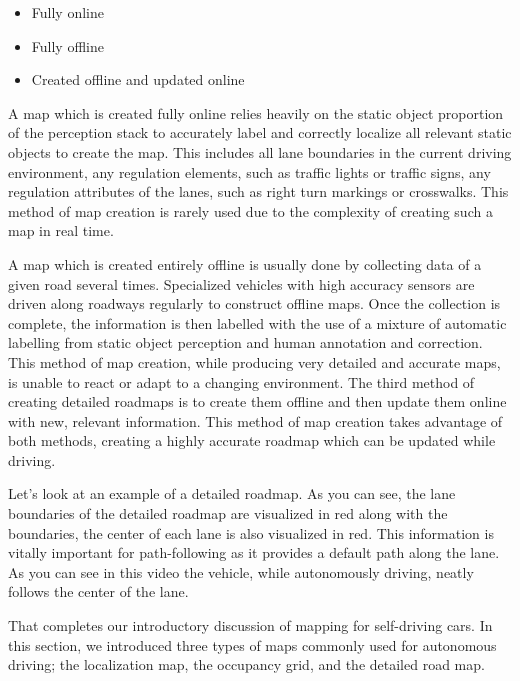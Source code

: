 \begin{itemize}
\item Fully online
\item Fully offline
\item Created offline and updated online
\end{itemize}

A map which is created fully online relies
heavily on the static object proportion of the perception stack
to accurately label and correctly localize all relevant
static objects to create the map. This includes all lane boundaries
in the current driving environment, any regulation elements,
such as traffic lights or traffic signs, any regulation attributes of the lanes,
such as right turn markings or crosswalks. This method of map creation is rarely used due to the complexity of
creating such a map in real time. 

A map which is created entirely offline
is usually done by collecting data of a given road several times. Specialized vehicles with high accuracy
sensors are driven along roadways regularly to construct offline maps. Once the collection is complete, the
information is then labelled with the use of a mixture of automatic labelling
from static object perception and human annotation and correction. This method of map creation,
while producing very detailed and accurate maps, is unable to react or
adapt to a changing environment. The third method of creating detailed
roadmaps is to create them offline and then update them online with new,
relevant information. This method of map creation
takes advantage of both methods, creating a highly accurate roadmap
which can be updated while driving. 

Let's look at an example of a detailed roadmap. As you can see, the lane boundaries of
the detailed roadmap are visualized in red along with the boundaries, the center
of each lane is also visualized in red. This information is vitally important for path-following as it provides
a default path along the lane. As you can see in this video the vehicle, while autonomously driving,
neatly follows the center of the lane. 



That completes our introductory discussion of
mapping for self-driving cars. In this section, we introduced  three
types of maps commonly used for autonomous driving; the localization map, the
occupancy grid, and the detailed road map. 



